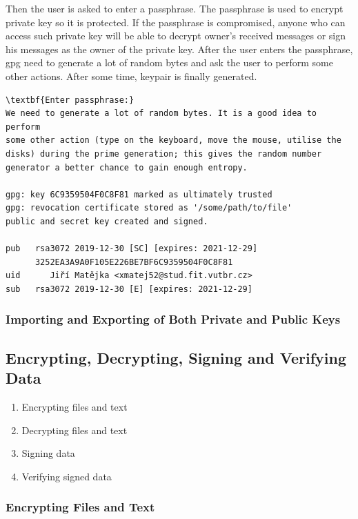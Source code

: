 Then the user is asked to enter a passphrase. The passphrase is used to encrypt private key so it is protected. If the passphrase is compromised, anyone who can access such private key will be able to decrypt owner's received messages or sign his messages as the owner of the private key. After the user enters the passphrase, gpg need to generate a lot of random bytes and ask the user to perform some other actions. After some time, keypair is finally generated.
\begin{Verbatim}[commandchars=\\\{\},codes={\catcode`$=3\catcode`_=8},samepage=true,frame=single]
\textbf{Enter passphrase:}
We need to generate a lot of random bytes. It is a good idea to perform
some other action (type on the keyboard, move the mouse, utilise the
disks) during the prime generation; this gives the random number
generator a better chance to gain enough entropy.

gpg: key 6C9359504F0C8F81 marked as ultimately trusted
gpg: revocation certificate stored as '/some/path/to/file'
public and secret key created and signed.

pub   rsa3072 2019-12-30 [SC] [expires: 2021-12-29]
      3252EA3A9A0F105E226BE7BF6C9359504F0C8F81
uid      Jiří Matějka <xmatej52@stud.fit.vutbr.cz>
sub   rsa3072 2019-12-30 [E] [expires: 2021-12-29]
\end{Verbatim}

\subsubsection*{Importing and Exporting of Both Private and Public Keys}


\subsection{Encrypting, Decrypting, Signing and Verifying Data}
\begin{enumerate}
    \item Encrypting files and text
    \item Decrypting files and text
    \item Signing data
    \item Verifying signed data
\end{enumerate}

\subsubsection*{Encrypting Files and Text}


